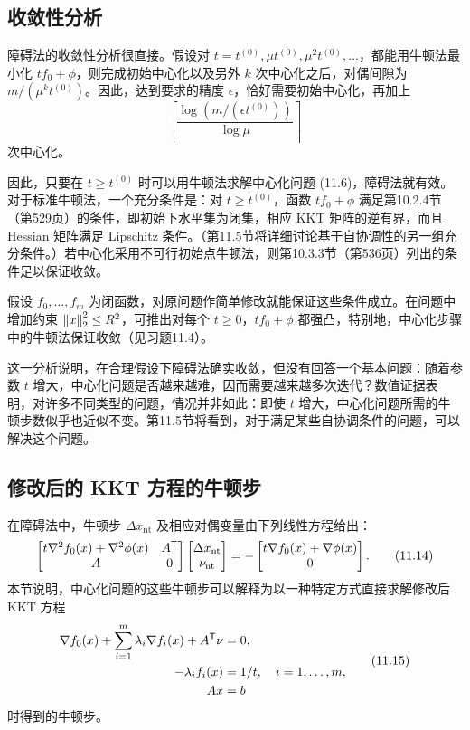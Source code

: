 \subsection{收敛性分析}
障碍法的收敛性分析很直接。假设对 $t=t^{(0)},\mu t^{(0)},\mu^2t^{(0)},\ldots$，都能用牛顿法最小化 $tf_0+\phi$，则完成初始中心化以及另外 $k$ 次中心化之后，对偶间隙为 $m/(\mu^k t^{(0)})$。因此，达到要求的精度 $\epsilon$，恰好需要初始中心化，再加上
\begin{equation}
\left\lceil\frac{\log(m/(\epsilon t^{(0)}))}{\log\mu}\right\rceil\tag{11.13}
\end{equation}
次中心化。

因此，只要在 $t\ge t^{(0)}$ 时可以用牛顿法求解中心化问题 (11.6)，障碍法就有效。对于标准牛顿法，一个充分条件是：对 $t\ge t^{(0)}$，函数 $tf_0+\phi$ 满足第10.2.4节（第529页）的条件，即初始下水平集为闭集，相应 KKT 矩阵的逆有界，而且 Hessian 矩阵满足 Lipschitz 条件。（第11.5节将详细讨论基于自协调性的另一组充分条件。）若中心化采用不可行初始点牛顿法，则第10.3.3节（第536页）列出的条件足以保证收敛。

假设 $f_0,\ldots,f_m$ 为闭函数，对原问题作简单修改就能保证这些条件成立。在问题中增加约束 $\left\lVert x\right\rVert_2^2\le R^2$，可推出对每个 $t\ge0$，$tf_0+\phi$ 都强凸，特别地，中心化步骤中的牛顿法保证收敛（见习题11.4）。

这一分析说明，在合理假设下障碍法确实收敛，但没有回答一个基本问题：随着参数 $t$ 增大，中心化问题是否越来越难，因而需要越来越多次迭代？数值证据表明，对许多不同类型的问题，情况并非如此：即使 $t$ 增大，中心化问题所需的牛顿步数似乎也近似不变。第11.5节将看到，对于满足某些自协调条件的问题，可以解决这个问题。

\subsection{修改后的 KKT 方程的牛顿步}
在障碍法中，牛顿步 $\Delta x_{\mathrm{nt}}$ 及相应对偶变量由下列线性方程给出：
\begin{equation}
\begin{bmatrix}t\nabla^2 f_0(x)+\nabla^2\phi(x)&A^\mathsf T\\A&0\end{bmatrix}
\begin{bmatrix}\Delta x_{\mathrm{nt}}\\\nu_{\mathrm{nt}}\end{bmatrix}
=-\begin{bmatrix}t\nabla f_0(x)+\nabla\phi(x)\\0\end{bmatrix}.\tag{11.14}
\end{equation}
本节说明，中心化问题的这些牛顿步可以解释为以一种特定方式直接求解修改后 KKT 方程
\begin{equation}\begin{aligned}
\nabla f_0(x)+\sum_{i=1}^m\lambda_i\nabla f_i(x)+A^\mathsf T\nu&=0,\\
-\lambda_i f_i(x)&=1/t,\quad i=1,\ldots,m,\\
Ax&=b
\end{aligned}\tag{11.15}\end{equation}
时得到的牛顿步。

